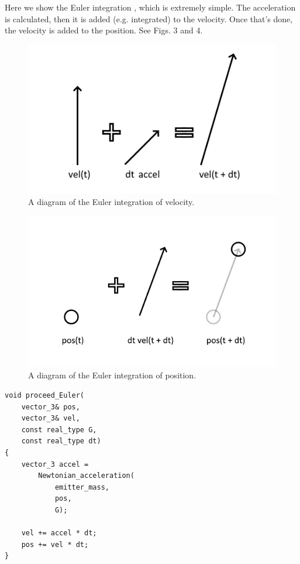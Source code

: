 \documentclass[12pt]{article}
\begin{document}
Here we show the Euler integration \cite{fiedler2}, which is extremely simple.
The acceleration is calculated, then it is added (e.g. integrated) to the velocity.
Once that's done, the velocity is added to the position.
See Figs. 3 and 4.
\begin{figure} 
\centering
\label{fig3}
  \includegraphics[width = 6 in]{velocity.png}
  \caption{
A diagram of the Euler integration of velocity.
}
\end{figure}
\begin{figure} 
\centering
\label{fig4}
  \includegraphics[width = 6 in]{position.png}
  \caption{
A diagram of the Euler integration of position.
}
\end{figure}

\begin{lstlisting}
void proceed_Euler(
	vector_3& pos, 
	vector_3& vel, 
	const real_type G, 
	const real_type dt)
{
	vector_3 accel = 
		Newtonian_acceleration(
			emitter_mass, 
			pos, 
			G);

	vel += accel * dt;
	pos += vel * dt;
}

\end{lstlisting}
\end{document}
